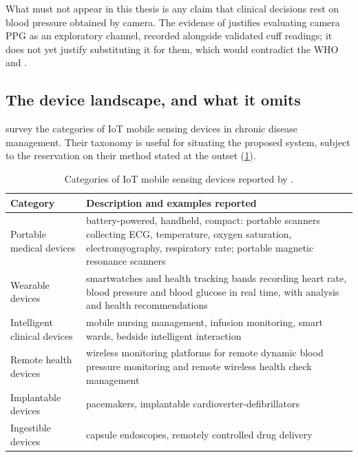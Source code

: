 \documentclass[12pt,a4paper,oneside]{report}
\begin{document}
What must not appear in this thesis is any claim that clinical decisions rest on blood pressure obtained by camera. The evidence of \textcite{liu2025ppg} justifies evaluating camera PPG as an exploratory channel, recorded alongside validated cuff readings; it does not yet justify substituting it for them, which would contradict the WHO and \textcite{alessa2019}.

\subsection{The device landscape, and what it omits}\label{sec:device-landscape}

\Textcite{liu2025review} survey the categories of IoT mobile sensing devices in chronic disease management. Their taxonomy is useful for situating the proposed system, subject to the reservation on their method stated at the outset (\cref{tab:device-categories}).

\begin{table}[htbp]
\centering\footnotesize
\caption{Categories of IoT mobile sensing devices reported by \textcite{liu2025review}.}\label{tab:device-categories}
\begin{tabularx}{\textwidth}{@{}>{\raggedright\arraybackslash}p{3.5cm} X@{}}
\toprule
\textbf{Category} & \textbf{Description and examples reported} \\
\midrule
Portable medical devices & battery-powered, handheld, compact: portable scanners collecting ECG, temperature, oxygen saturation, electromyography, respiratory rate; portable magnetic resonance scanners \\
Wearable devices & smartwatches and health tracking bands recording heart rate, blood pressure and blood glucose in real time, with analysis and health recommendations \\
Intelligent clinical devices & mobile nursing management, infusion monitoring, smart wards, bedside intelligent interaction \\
Remote health devices & wireless monitoring platforms for remote dynamic blood pressure monitoring and remote wireless health check management \\
Implantable devices & pacemakers, implantable cardioverter-defibrillators \\
Ingestible devices & capsule endoscopes, remotely controlled drug delivery \\
\bottomrule
\end{tabularx}
\end{table}
\end{document}
